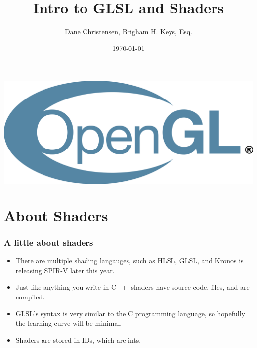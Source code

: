\documentclass{beamer}
\title[GLSL Part 1]{Intro to GLSL and Shaders} %
\author{Dane Christensen, Brigham H. Keys, Esq.} %
\institute[BYU-Idaho] %
{
  Brigham Young University - Idaho\\
  \medskip
  \textit{bkeys@bkeys.org} %
}
\date{\today} %
\begin{document}
\begin{frame}

  \titlepage %
  \includegraphics[scale=.1]{../logo.png}
\end{frame}



\section{About Shaders}

\begin{frame}

  \frametitle{A little about shaders}

  \begin{itemize}
  \item There are multiple shading langauges, such as HLSL, GLSL, and Kronos is releasing SPIR-V later this year.
  \item Just like anything you write in C++, shaders have source code, files, and are compiled.
  \item GLSL's syntax is very similar to the C programming language, so hopefully the learning curve will be minimal.
  \item Shaders are stored in IDs, which are ints.
  \end{itemize}

\end{frame}
\end{document}
